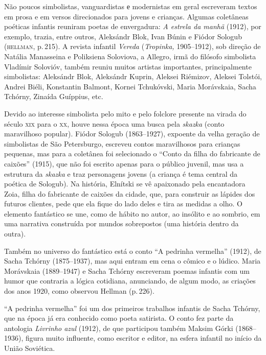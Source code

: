 Não poucos simbolistas, vanguardistas е modernistas em geral escreveram
textos em prosa e em versos direcionados para jovens e crianças. Algumas
coletâneas poéticas infantis reuniram poetas de envergadura: \emph{A
estrela da manhã} (1912), por exemplo, trazia, entre outros,
Aleksándr Blok, Ivan Búnin e Fiódor Sologub (\textsc{hellman}, p.\,215). A revista
infantil \emph{Vereda} (\emph{Tropinka,} 1905--1912), sob direção de
Natália Manasseina e Poliksiena Soloviova, a Allegro, irmã do filósofo simbolista Vladímir Solovióv,
também reuniu muitos artistas importantes, principalmente simbolistas:
Aleksándr Blok, Aleksándr Kuprin, Aleksei Riémizov, Aleksei Tolstói,
Andrei Biéli, Konstantin Balmont, Kornei Tchukóvski, Maria Morávskaia,
Sacha Tchórny, Zinaída Guíppius, etc.

Devido ao interesse simbolista pelo mito e pelo folclore presente na
virada do século \textsc{xix} para o \textsc{xx}, houve nessa época uma busca pela
\emph{skazka} (conto maravilhoso popular). Fiódor Sologub (1863--1927),
expoente da velha geração de simbolistas de São Petersburgo, escreveu
contos maravilhosos para crianças pequenas, mas para a coletânea foi
selecionado o ``Conto da filha do fabricante de caixões'' (1915),
que não foi escrito apenas para o público juvenil, mas usa a estrutura
da \emph{skazka} e traz personagens jovens (a criança é tema central da
poética de Sologub). Na história, Elnítski se vê apaixonado pela
encantadora Zoia, filha do fabricante de caixões da cidade, que, para
construir as lápides dos futuros clientes, pede que ela fique do lado
deles e tira as medidas a olho. O elemento fantástico se une, como de
hábito no autor, ao insólito e ao sombrio, em uma narrativa construída
por mundos sobrepostos (uma história dentro da outra).

Também no universo do fantástico está o conto ``A pedrinha vermelha''
(1912), de Sacha Tchórny (1875--1937), mas aqui entram em cena o
cômico e o lúdico. Maria Morávskaia (1889--1947) e Sacha Tchórny
escreveram poemas infantis com um humor que contraria a lógica
cotidiana, anunciando, de algum modo, as criações dos anos 1920, como
observou Hellman (p.\,226).

``A pedrinha vermelha'' foi um dos primeiros trabalhos infantis de Sacha
Tchórny, que na época já era conhecido como poeta satirista. O conto fez
parte da antologia \emph{Livrinho azul} (1912), de que participou também
Maksim Górki (1868--1936), figura muito influente, como escritor e
editor, na esfera infantil no início da União Soviética.


